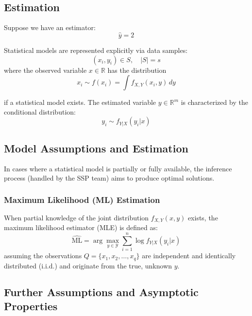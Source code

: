 \documentclass[a4paper, 11pt]{article}
\begin{document}
\subsection{Estimation}

Suppose we have an estimator:
\begin{equation}
\hat{y} = 2
\end{equation}

Statistical models are represented explicitly via data samples:
\begin{equation}
(x_i, y_i) \in S, \quad |S| = s
\end{equation}
where the observed variable \( x \in \mathbb{R} \) has the distribution
\begin{equation}
x_i \sim f(x_i) = \int f_{X,Y}(x_i, y) \, dy
\end{equation}

if a statistical model exists. The estimated variable \( y \in \mathbb{R}^m \) is characterized by the conditional distribution:
\begin{equation}
y_i \sim f_{Y|X}(y_i | x)
\end{equation}

\subsection{Model Assumptions and Estimation}

In cases where a statistical model is partially or fully available, the inference process (handled by the SSP team) aims to produce optimal solutions.

\subsubsection{Maximum Likelihood (ML) Estimation}

When partial knowledge of the joint distribution \( f_{X,Y}(x,y) \) exists, the maximum likelihood estimator (MLE) is defined as:
\begin{equation}
\hat{\text{ML}} = \arg \max_{y \in \mathcal{Y}} \sum_{i=1}^n \log f_{Y|X}(y_i | x)
\end{equation}
assuming the observations \( Q = \{x_1, x_2, \ldots, x_q\} \) are independent and identically distributed (i.i.d.) and originate from the true, unknown \( y \).

\subsection{Further Assumptions and Asymptotic Properties}
\end{document}
